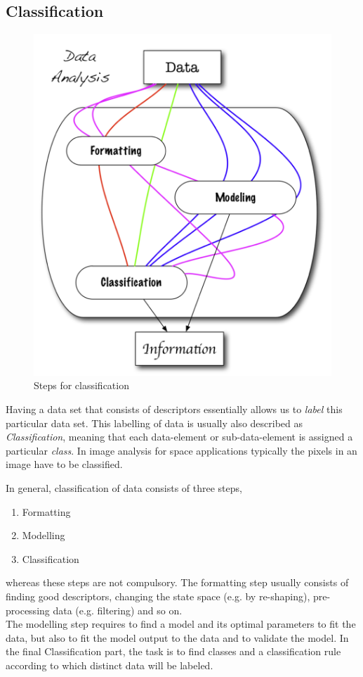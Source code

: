 \subsection{Classification}
\begin{figure}[h!]
	\centering
	\includegraphics[width=\textwidth/2-5em]{images/data_analysis.png}
	\caption{Steps for classification \protect\footnotemark}
	\label{fig:data_anal}
\end{figure}
Having a data set that consists of descriptors essentially allows us to \textit{label} this particular data set. This labelling of data is usually also described as \textit{Classification}, meaning that each data-element or sub-data-element is assigned a particular \textit{class}. In image analysis for space applications typically the pixels in an image have to be classified.

In general, classification of data consists of three steps,
\begin{enumerate}
	\item Formatting
	\item Modelling
	\item Classification
\end{enumerate}
whereas these steps are not compulsory. The formatting step usually consists of finding good descriptors, changing the state space (e.g. by re-shaping), pre-processing data (e.g. filtering) and so on.\\
The modelling step requires to find a model and its optimal parameters to fit the data, but also to fit the model output to the data and to validate the model.
In the final Classification part, the task is to find classes and a classification rule according to which distinct data will be labeled.

